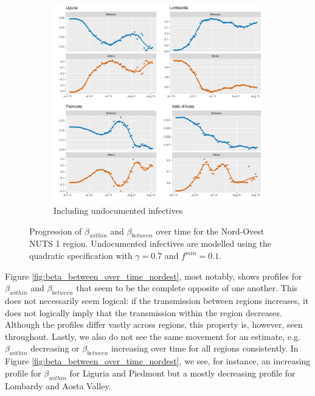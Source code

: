 \documentclass[12pt]{article}
\begin{document}
    \begin{figure}[H]\ContinuedFloat
	    \begin{subfigure}{\textwidth}
	      \centering
	      \includegraphics[width=0.94\linewidth]{output/model_between_lag14_betas_Nord-Ovest_UndocQuadratic_rolling.pdf}
	      \caption{Including undocumented infectives}
	      \label{fig:beta_between_over_time_nordovest_regular_undoc}
	    \end{subfigure}
	    \caption{Progression of $\beta_{within}$ and $\beta_{between}$ over time for the Nord-Ovest NUTS 1 region. Undocumented infectives are modelled using the quadratic specification with $\gamma = 0.7$ and $f^{min}=0.1$.}
	    \label{fig:beta_between_over_time_nordovest}
    \end{figure}
	
	Figure \ref{fig:beta_between_over_time_nordest}, most notably, shows profiles for $\beta_{within}$ and $\beta_{between}$ that seem to be the complete opposite of one another. This does not necessarily seem logical: if the transmission between regions increases, it does not logically imply that the transmission within the region decreases. Although the profiles differ vastly across regions, this property is, however, seen throughout. Lastly, we also do not see the same movement for an estimate, e.g. $\beta_{within}$ decreasing or $\beta_{between}$ increasing over time for all regions consistently. In Figure \ref{fig:beta_between_over_time_nordest}, we see, for instance, an increasing profile for $\beta_{within}$ for Liguria and Piedmont but a mostly decreasing profile for Lombardy and Aosta Valley.
	
\end{document}
